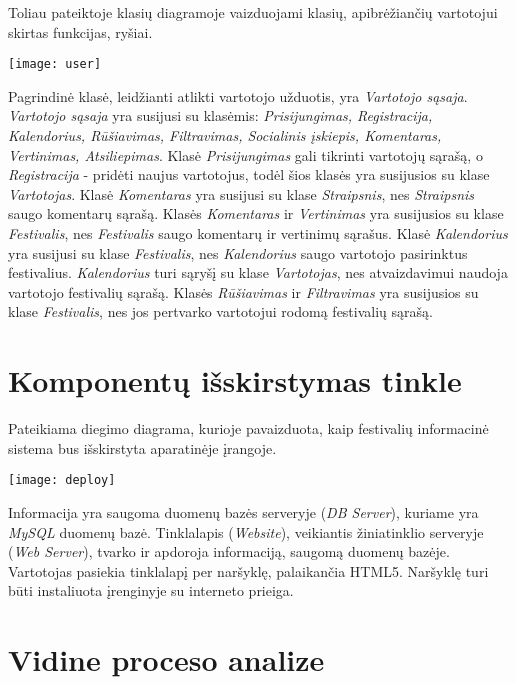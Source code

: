 ﻿\documentclass{VUMIFPSkursinis}
\begin{document}
{Toliau pateiktoje klasių diagramoje vaizduojami klasių, apibrėžiančių vartotojui skirtas funkcijas, ryšiai.
\begin{center}
    \texttt{[image: user]}
\end{center}
Pagrindinė klasė, leidžianti atlikti vartotojo užduotis, yra \textit{Vartotojo sąsaja}. \textit{Vartotojo sąsaja} yra susijusi su klasėmis: \textit{Prisijungimas, Registracija, Kalendorius, Rūšiavimas, Filtravimas, Socialinis įskiepis, Komentaras, Vertinimas, Atsiliepimas}. Klasė \textit{Prisijungimas} gali tikrinti vartotojų sąrašą, o \textit{Registracija} - pridėti naujus vartotojus, todėl šios klasės yra susijusios su klase \textit{Vartotojas}. Klasė \textit{Komentaras} yra susijusi su klase \textit{Straipsnis}, nes \textit{Straipsnis} saugo komentarų sąrašą. Klasės \textit{Komentaras} ir \textit{Vertinimas} yra susijusios su klase \textit{Festivalis}, nes \textit{Festivalis} saugo komentarų ir vertinimų sąrašus. Klasė \textit{Kalendorius} yra susijusi su klase \textit{Festivalis}, nes \textit{Kalendorius} saugo vartotojo pasirinktus festivalius. \textit{Kalendorius} turi sąryšį su klase \textit{Vartotojas}, nes atvaizdavimui naudoja vartotojo festivalių sąrašą. Klasės \textit{Rūšiavimas} ir \textit{Filtravimas} yra susijusios su klase \textit{Festivalis}, nes jos pertvarko vartotojui rodomą festivalių sąrašą.

\section{Komponentų išskirstymas tinkle}
Pateikiama diegimo diagrama, kurioje pavaizduota, kaip festivalių informacinė sistema bus išskirstyta aparatinėje įrangoje. 
\begin{center}
    \texttt{[image: deploy]}
\end{center}
Informacija yra saugoma duomenų bazės serveryje (\textit{DB Server}), kuriame yra \textit{MySQL} duomenų bazė. Tinklalapis (\textit{Website}), veikiantis žiniatinklio serveryje (\textit{Web Server}), tvarko ir apdoroja informaciją, saugomą duomenų bazėje. Vartotojas pasiekia tinklalapį per naršyklę, palaikančia HTML5. Naršyklę turi būti instaliuota įrenginyje su interneto prieiga.


\section{Vidine proceso analize}
}
\end{document}
